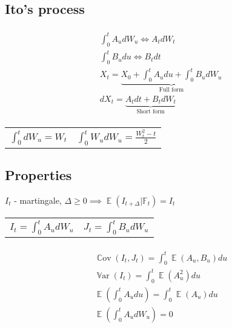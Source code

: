 \documentclass{article}
\def\Var#1{{\operatorname{\mathbb{V}ar} \left({#1}\right)}}
\def\Cov#1{{\operatorname{\mathbb{C}ov} \left({#1}\right)}}
\def\Exp#1{{\operatorname{\mathbb{E}} \left({#1}\right)}}
\def\Eq#1{{\begin{gather}\begin{split} #1 \end{split}\end{gather}}}
\begin{document}
\begin{multicols}{2}
    \subsection*{Ito's process}
    \Eq{
        &\int_0^t A_u dW_u \iff A_t dW_t \\
        &\int_0^t B_u du \iff B_t dt \\
        &X_t = \underbrace{X_0 + \int_0^t A_u du + \int_0^t B_u dW_u}_{\text{Full form}}\\
        &dX_t = \underbrace{A_t dt + B_t dW_t}_{\text{Short form}}
    }
    \begin{center}
    \begin{tabular}{l l}
    $\int_0^t dW_u = W_t$ &
    $\int_0^t W_u dW_u = \frac{W_t^2 - t}{2}$
    \end{tabular}
    \end{center}
    \subsection*{Properties}
    $I_t$ - martingale, $\Delta \geq 0 \implies \Exp{I_{t + \Delta} | \mathbb{F}_t} = I_t$
    \begin{center}
    \begin{tabular}{l l}
    $I_t = \int_0^t A_u dW_u$ & $J_t = \int_0^t B_u dW_u$ \\
    \end{tabular}
    \end{center}
    \Eq
    {
        &\Cov{ I_t, J_t } = \int_0^t \Exp{A_u, B_u} du \\
        &\Var{ I_t } = \int_0^t \Exp{A_u^2} du \\
        &\Exp{\int_0^t A_u du} = \int_0^t \Exp{A_u} du \\
        &\Exp{\int_0^t A_u dW_u} = 0
    }
\end{multicols}
\end{document}

